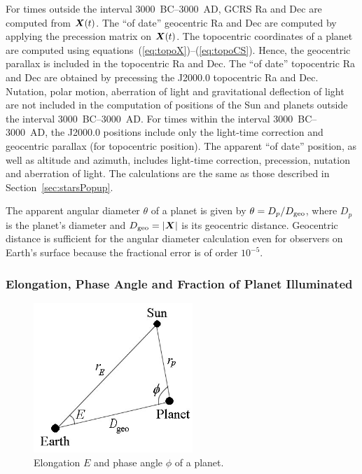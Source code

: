 \documentclass[12pt]{article}
\newcommand{\ve}[1]{\mbox{\boldmath $#1$}}
\begin{document}
For times outside the interval 3000~BC--3000~AD, 
GCRS Ra and Dec are computed from $\ve{X}(t)$. The ``of date'' geocentric Ra and Dec are 
computed by applying the precession matrix on $\ve{X}(t)$. 
The topocentric coordinates of a planet are computed using 
equations~(\ref{eq:topoX})--(\ref{eq:topoCS}). Hence, the geocentric parallax 
is included in the topocentric Ra and Dec. The ``of date'' topocentric 
Ra and Dec are obtained by precessing the J2000.0 topocentric Ra and Dec.
Nutation, polar motion, aberration of light 
and gravitational deflection of light are not included in the computation of 
positions of the Sun and planets outside the interval 3000~BC--3000~AD. 
For times within the interval 3000~BC--3000~AD, the J2000.0 positions 
include only the light-time correction and geocentric parallax (for topocentric 
position). The apparent ``of date'' position, as well as altitude and azimuth, 
includes light-time correction, 
precession, nutation and aberration of light. The calculations are the same 
as those described in Section~\ref{sec:starsPopup}.

The apparent angular diameter $\theta$ of a planet is given by 
$\theta = D_p/D_{\rm geo}$,
where $D_p$ is the planet's diameter and $D_{\rm geo}=|\ve{X}|$ is 
its geocentric distance. Geocentric distance is sufficient for the 
angular diameter calculation even for observers on Earth's surface because 
the fractional error is of order $10^{-5}$.

\subsubsection{Elongation, Phase Angle and Fraction of Planet Illuminated}

\begin{figure}[h]
\begin{center}
\includegraphics[width=6cm]{elongation_phaseAngle.jpg}
\end{center}
\caption{Elongation $E$ and phase angle $\phi$ of a planet.}
\label{fig:ElongPhaseAng}
\end{figure}
\end{document}
